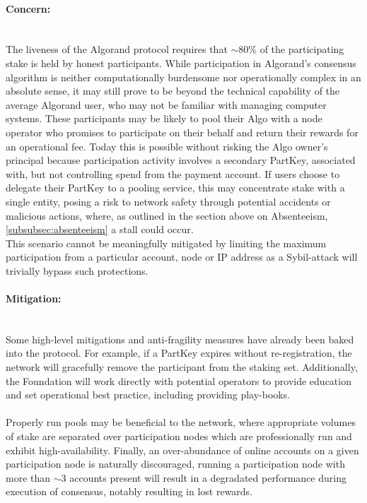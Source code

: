 \documentclass[11pt,a4paper]{article}
\begin{document}
\paragraph{Concern:} \mbox{}\\
The liveness of the Algorand protocol requires that $\sim$80\% of the participating stake is held by honest 
participants. While participation in Algorand's consensus algorithm is neither computationally burdensome nor 
operationally complex in an absolute sense, it may still prove to be beyond the technical capability of the average 
Algorand user, who may not be familiar with managing computer systems. These participants may be likely to pool their 
Algo with a node operator who promises to participate on their behalf and return their rewards for an operational fee. 
Today this is possible without risking the Algo owner’s principal because participation activity involves a secondary 
\gls{PartKey}, associated with, but not controlling spend from the payment account. If users choose to delegate their 
\gls{PartKey} to a pooling service, this may concentrate stake with a single entity, posing a risk to network safety 
through potential accidents or malicious actions, where, as outlined in the section above on Absenteeism, 
\ref{subsubsec:absenteeism} a stall could occur. \\ 

This scenario cannot be meaningfully mitigated by limiting the maximum participation from a particular account, 
node or IP address as a Sybil-attack will trivially bypass such protections.

\paragraph{Mitigation:} \mbox{}\\
Some high-level mitigations and anti-fragility measures have already been baked into the protocol. For example, if a
\gls{PartKey} expires without re-registration, the network will gracefully remove the participant from the staking set.
Additionally, the Foundation will work directly with potential operators to provide education and set operational best 
practice, including providing play-books. \\ \\
Properly run pools may be beneficial to the network, where appropriate volumes of stake are separated over
participation nodes which are professionally run and exhibit high-availability. Finally, an over-abundance of online 
accounts on a given participation node is naturally discouraged, running a participation node with more than $\sim$3 
accounts present will result in a degradated performance during execution of consensus, notably resulting in lost 
rewards.
\end{document}
